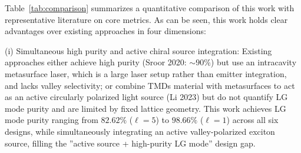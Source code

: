 \label{ssec:compare_metasurface}

\begin{table}[htb]
\centering
\caption{Quantitative comparison of this work with representative existing OAM metasurface approaches.}
\label{tab:comparison}
\end{table}


Table~\ref{tab:comparison} summarizes a quantitative comparison of this work with representative literature on core metrics. As can be seen, this work holds clear advantages over existing approaches in four dimensions:

(i) Simultaneous high purity and active chiral source integration: Existing approaches either achieve high purity (Sroor 2020: $\sim 90\%$) but use an intracavity metasurface laser, which is a large laser setup rather than emitter integration, and lacks valley selectivity; or combine TMDs material with metasurfaces to act as an active circularly polarized light source (Li 2023) but do not quantify LG mode purity and are limited by fixed lattice geometry. This work achieves LG mode purity ranging from $82.62\%$ ($\ell = 5$) to $98.66\%$ ($\ell = 1$) across all six designs, while simultaneously integrating an active valley-polarized exciton source, filling the ''active source + high-purity LG mode'' design gap.


